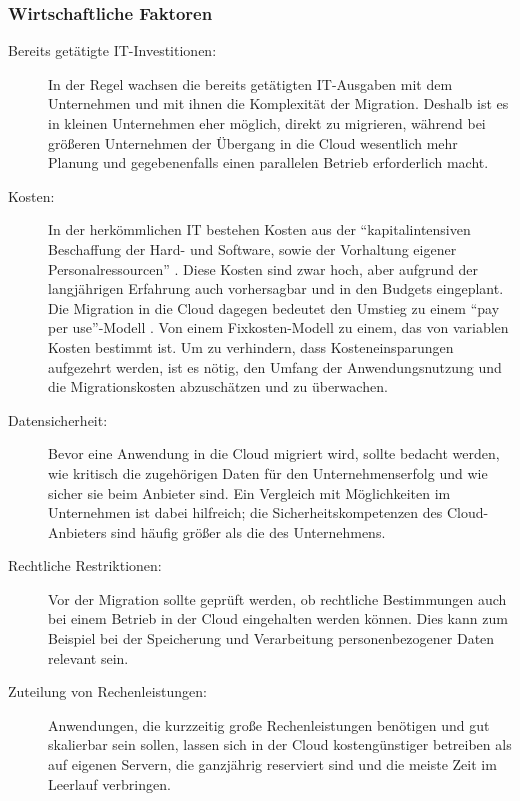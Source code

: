 \subsubsection{Wirtschaftliche Faktoren}
\begin{description}
	\item[Bereits getätigte IT-Investitionen:]
	In der Regel wachsen die bereits getätigten IT-Ausgaben mit dem
Unternehmen und mit ihnen die Komplexität der Migration. Deshalb ist es in
kleinen Unternehmen eher möglich, direkt zu migrieren, während bei
größeren Unternehmen der Übergang in die Cloud wesentlich mehr Planung und
gegebenenfalls einen parallelen Betrieb erforderlich macht.

	\item[Kosten:] In der herkömmlichen IT bestehen Kosten aus der
"`kapitalintensiven Beschaffung der Hard- und Software, sowie der Vorhaltung
eigener Personalressourcen"' . Diese Kosten sind
zwar hoch, aber aufgrund der langjährigen Erfahrung auch vorhersagbar und in den 
Budgets eingeplant. Die Migration in die Cloud dagegen bedeutet den Umstieg zu
einem "`pay per use"'-Modell . Von einem 
Fixkosten-Modell zu einem, das von variablen Kosten bestimmt
ist.
Um zu verhindern, dass Kosteneinsparungen aufgezehrt werden, ist es nötig,
den Umfang der Anwendungsnutzung und die Migrationskosten abzuschätzen und zu 
überwachen.


	\item[Datensicherheit:] Bevor eine Anwendung in die Cloud migriert
wird, sollte bedacht werden, wie kritisch die zugehörigen Daten für den
Unternehmenserfolg und wie sicher sie beim Anbieter sind. Ein Vergleich mit 
Möglichkeiten im Unternehmen ist dabei hilfreich; die Sicherheitskompetenzen 
des Cloud-Anbieters sind häufig größer als die des Unternehmens.
	\item[Rechtliche Restriktionen:] Vor der Migration sollte geprüft
werden, ob rechtliche Bestimmungen auch bei einem Betrieb in der Cloud
eingehalten werden können. Dies kann zum Beispiel bei der Speicherung und 
Verarbeitung personenbezogener Daten relevant sein.
	\item[Zuteilung von Rechenleistungen:] Anwendungen, die kurzzeitig
große Rechenleistungen benötigen und gut skalierbar sein sollen, lassen sich in
der Cloud kostengünstiger betreiben als auf eigenen Servern, die
ganzjährig reserviert sind und die meiste Zeit im Leerlauf verbringen.
\end{description}


